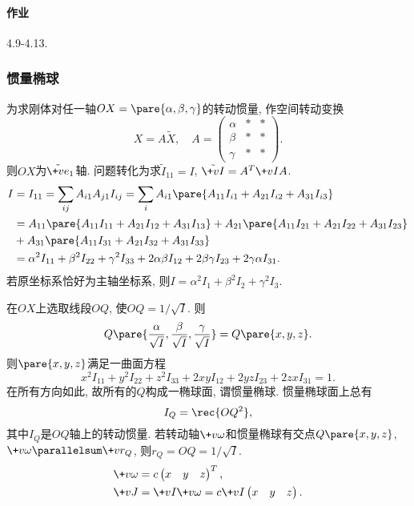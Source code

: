 \documentclass[../LectureNotes.tex]{subfiles}
\begin{document}
\paragraph{作业} %
\label{par:作业}

4.9-4.13.



\subsubsection{惯量椭球} %
\label{ssub:惯量椭球}

为求刚体对任一轴$OX=\pare{\alpha,\beta,\gamma}$的转动惯量, 作空间转动变换
\[ X = A\tilde{X},\quad A = \begin{pmatrix}
    \alpha & * & * \\
    \beta & * & * \\
    \gamma & * & *
\end{pmatrix}. \]
则$OX$为$\tilde{\+ve}_1$轴. 问题转化为求$\tilde{I}_{11} = I$, $\tilde{\+vI} = A^T \+vI A$.
\begin{align*}
    I &= I_{11} = \sum_{ij} A_{i1}A_{j1}I_{ij} = \sum_{i} A_{i1} \pare{A_{11}I_{i1} + A_{21}I_{i2} + A_{31}I_{i3}} \\
    &= A_{11}\pare{A_{11}I_{11} + A_{21}I_{12} + A_{31}I_{13}} + A_{21}\pare{A_{11} I_{21} + A_{21}I_{22} + A_{31}I_{23}} \\
    &+ A_{31}\pare{A_{11} I_{31} + A_{21}I_{32} + A_{31}I_{33}} \\
    &= \alpha^2 I_{11} + \beta^2 I_{22} + \gamma^2 I_{33} + 2\alpha\beta I_{12} + 2\beta\gamma I_{23} + 2\gamma\alpha I_{31}.
\end{align*}
若原坐标系恰好为主轴坐标系, 则$I = \alpha^2 I_1 + \beta^2 I_2 + \gamma^2 I_3$.
\par
在$OX$上选取线段$OQ$, 使$OQ = 1/\sqrt{I}$. 则
\[ Q\pare{\frac{\alpha}{\sqrt{I}}, \frac{\beta}{\sqrt{I}}, \frac{\gamma}{\sqrt{I}}} = Q\pare{x,y,z}. \]
则$\pare{x,y,z}$满足一曲面方程
\[ x^2 I_{11} + y^2 I_{22} + z^2 I_{33} + 2xy I_{12} + 2yz I_{23} + 2zx I_{31} = 1. \]
在所有方向如此, 故所有的$Q$构成一椭球面, 谓惯量椭球. 惯量椭球面上总有
\[ I_Q = \rec{OQ^2}, \]
其中$I_Q$是$OQ$轴上的转动惯量. 若转动轴$\+v\omega$和惯量椭球有交点$Q\pare{x,y,z}$, $\+v\omega\parallelsum \+vr_Q$, 则$r_Q = OQ = 1/\sqrt{I}$.
\begin{align*}
    \+v\omega &= c \begin{pmatrix}
        x & y & z
    \end{pmatrix}^T, \\
    \+vJ &= \+vI\+v\omega = c\+vI \begin{pmatrix}
        x & y & z
    \end{pmatrix}.
\end{align*}
\end{document}
